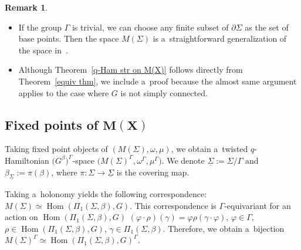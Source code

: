 \documentclass[10pt,a4paper]{amsart}
\numberwithin{equation}{section}
\theoremstyle{definition}
\newtheorem{Remark}[Theorem]{Remark}
\newcommand{\Hom}{\operatorname{Hom}}
\begin{document}
\begin{Remark}\quad
\begin{itemize}\itemsep=0pt
 \item[(1)] If the group $\Gamma$ is trivial, we can choose any finite subset of $\partial \Sigma$ as the set of base points.
 Then the space $M(\Sigma)$ is a~straightforward generalization of the space in~\cite[Theorem~9.1]{AMM}.
 \item[(2)] Although Theorem~\ref{q-Ham str on M(X)} follows directly from Theorem~\ref{equiv thm}, we include a~proof because the almost same argument applies to the case where $G$ is not simply connected.
 \end{itemize}
\end{Remark}

\subsection[Fixed points of M(X)]{Fixed points of $\boldsymbol{M(X)}$}\label{section_twisted_reps}
Taking fixed point objects of $(M(\Sigma),\omega,\mu)$, we obtain a~twisted $q$-Hamiltonian $\bigl(G^{\beta}\bigr)^{\Gamma}$-space $\bigl(M(\Sigma)^{\Gamma},\omega^{\Gamma},\mu^{\Gamma}\bigr)$.
We denote $ \underline{\Sigma} := \Sigma /\Gamma$ and $\beta_{\underline{\Sigma}} := \pi(\beta)$, where $\pi \colon \Sigma \to \underline{\Sigma}$ is the covering map.

Taking a~holonomy yields the following correspondence: $M(\Sigma) \simeq \Hom(\Pi_1(\Sigma,\beta),G)$.
This correspondence is $\Gamma$-equivariant for an action on $\Hom(\Pi_1(\Sigma,\beta),G)$
$(\varphi \cdot \rho)(\gamma) = \varphi \rho(\gamma\cdot\varphi)$, $
 \varphi \in \Gamma$, ${\rho \in \Hom(\Pi_1(\Sigma,\beta),G)}$, $ \gamma \in \Pi_1(\Sigma,\beta)$.
Therefore, we obtain a~bijection $M(\Sigma)^{\Gamma} \simeq \Hom(\Pi_1(\Sigma,\beta),G)^{\Gamma}$.
\end{document}
